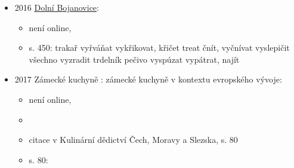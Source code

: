 \begin{itemize}
  \begin{itemize}
  \tightlist
  \item
    JEDLIČKOVÁ, Blanka, LENDEROVÁ, Milena, KOUBA, Miroslav a ŘÍHA, Ivo.
    Krajiny prostřených i prázdných stolů. Díl I. Evropská gastronomie v
    proměnách staletí. Vydání první. , s. 228. ISBN 978-80-7560-026-4.
  \item
    není online,
  \item
    \emph{Proměny svatebního stolování 1826-\/-1940 se zaměřením na
    městské prostředí}, 
  \item
    s. 228: Samostatnou pozornost zasluhuje nevěstin koláč, který svou
    jedinečností vynikal nad běžné kynuté pečivo a trdelníky, které se
    pekly i na posvícení.729 Pilo se hlavně pivo, méně víno, na

    \begin{itemize}
    \tightlist
    \item
      citujou M. Úlehlovou-Tilschovou, \emph{Česká strava lidová}, s.
      415. popisujou svatební pokrmy
    \end{itemize}
  \end{itemize}
\item
  2016
  \href{https://www.digitalniknihovna.cz/mzk/uuid/uuid:fac76280-c7bd-11ec-abb4-5ef3fc9bb22f}{Dolní
  Bojanovice}:

  \begin{itemize}
  \tightlist
  \item
    není online, 
  \item
    s. 450: trakař vyřváňat vykřikovat, křičet treat čnít, vyčnívat
    vyslepičit všechno vyzradit trdelník pečivo vyspúzat vypátrat, najít
  \end{itemize}
\item
  2017 Zámecké kuchyně : zámecké kuchyně v kontextu evropského vývoje:

  \begin{itemize}
  \tightlist
  \item
    není online,
  \item
  \item
    citace v Kulinární dědictví Čech, Moravy a Slezska, s. 80
  \item
    s. 80:


\end{itemize}
\end{itemize}
